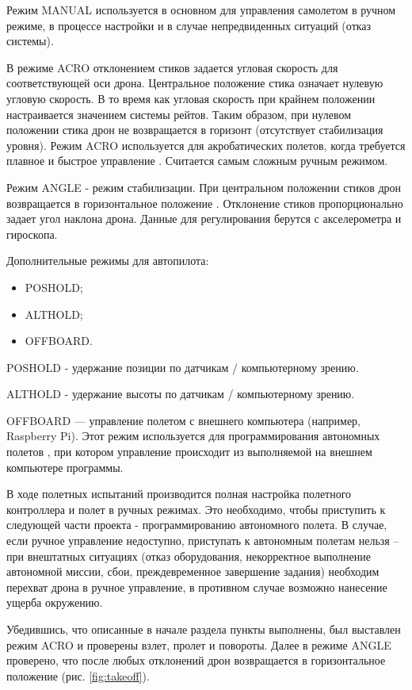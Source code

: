 Режим MANUAL используется в основном для управления самолетом в ручном режиме, в процессе настройки и в случае непредвиденных ситуаций (отказ системы).

В режиме ACRO отклонением стиков задается угловая скорость для соответствующей  оси дрона. Центральное положение стика означает нулевую угловую скорость. В то время как угловая скорость при крайнем положении настраивается значением системы рейтов. Таким образом, при нулевом положении стика дрон не возвращается в горизонт (отсутствует стабилизация уровня). Режим ACRO используется для акробатических полетов, когда требуется плавное и быстрое управление \cite{ardupilot}. Считается самым сложным ручным режимом.

Режим ANGLE - режим стабилизации. При центральном положении стиков дрон возвращается в горизонтальное положение \cite{dcl}. Отклонение стиков пропорционально задает угол наклона дрона. Данные для регулирования берутся с акселерометра и гироскопа.

Дополнительные режимы для автопилота:
\begin{itemize}
	\item POSHOLD;
	\item ALTHOLD;
	\item OFFBOARD.
\end{itemize}

POSHOLD - удержание позиции по датчикам / компьютерному зрению.

ALTHOLD - удержание высоты по датчикам / компьютерному зрению. 

OFFBOARD — управление полетом с внешнего компьютера (например, Raspberry Pi). Этот режим используется для программирования автономных полетов \cite{clover}, при котором управление происходит из выполняемой на внешнем компьютере программы.

В ходе полетных испытаний производится полная настройка полетного контроллера и полет в ручных режимах. Это необходимо, чтобы приступить к следующей части проекта - программированию автономного полета. В случае, если ручное управление недоступно, приступать к автономным полетам нельзя -- при внештатных ситуациях (отказ оборудования, некорректное выполнение автономной миссии, сбои, преждевременное завершение задания) необходим перехват дрона в ручное управление, в противном случае возможно нанесение ущерба окружению.

Убедившись, что описанные в начале раздела пункты выполнены, был выставлен режим ACRO и проверены взлет, пролет и повороты. Далее в режиме ANGLE проверено, что после любых отклонений дрон возвращается в горизонтальное положение (рис. \ref{fig:takeoff}).

